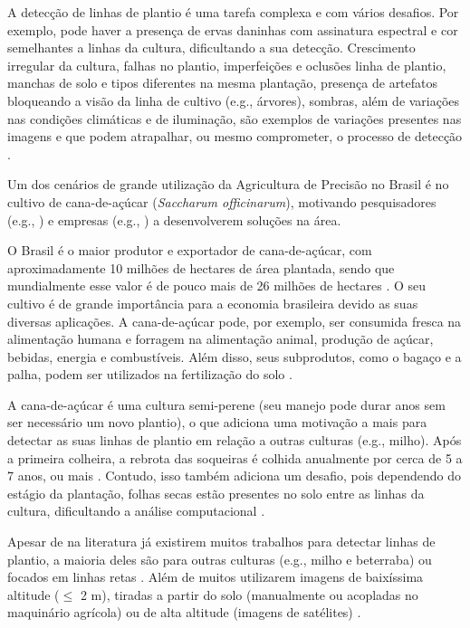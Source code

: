 \documentclass[12pt, a4paper, english, brazil]{article}
\begin{document}
A detecção de linhas de plantio é uma tarefa complexa e com vários desafios. Por exemplo, pode haver a presença de ervas daninhas com assinatura espectral e cor semelhantes a linhas da cultura, dificultando a sua detecção. Crescimento irregular da cultura, falhas no plantio, imperfeições e oclusões linha de plantio, manchas de solo e tipos diferentes na mesma plantação, presença de artefatos bloqueando a visão da linha de cultivo (e.g., árvores), sombras, além de variações nas condições climáticas e de iluminação, são exemplos de variações presentes nas imagens e que podem atrapalhar, ou mesmo comprometer, o processo de detecção  \cite{Rabab_2021, Doha_2021}.

Um dos cenários de grande utilização da Agricultura de Precisão no Brasil é no cultivo de cana-de-açúcar (\textit{Saccharum officinarum}), motivando pesquisadores (e.g., ) e empresas (e.g., ) a desenvolverem soluções na área.

O Brasil é o maior produtor e exportador de cana-de-açúcar, com aproximadamente 10 milhões de hectares de área plantada, sendo que mundialmente esse valor é de pouco mais de 26 milhões de hectares \cite{Ritchie_2020, IBGE_2021, FAOSTAT_2021}. O seu cultivo é de grande importância para a economia brasileira devido as suas diversas aplicações. A cana-de-açúcar pode, por exemplo, ser consumida fresca na alimentação humana e forragem na alimentação animal, produção de açúcar, bebidas, energia e combustíveis. Além disso, seus subprodutos, como o bagaço e a palha, podem ser utilizados na fertilização do solo \cite{Oliveira_2018}.

A cana-de-açúcar é uma cultura semi-perene (seu manejo pode durar anos sem ser necessário um novo plantio), o que adiciona uma motivação a mais para detectar as suas linhas de plantio em relação a outras culturas (e.g., milho). Após a primeira colheira, a rebrota das soqueiras é colhida anualmente por cerca de 5 a 7 anos, ou mais \cite{Rudorff_2010}. Contudo, isso também adiciona um desafio, pois dependendo do estágio da plantação, folhas secas estão presentes no solo entre as linhas da cultura, dificultando a análise computacional \cite{Silva_2020}.

Apesar de na literatura já existirem muitos trabalhos para detectar linhas de plantio, a maioria deles são para outras culturas (e.g., milho e beterraba) ou focados em linhas retas \cite{Pereira_Junior_2020}. Além de muitos utilizarem imagens de baixíssima altitude ($\le$ 2 m), tiradas a partir do solo (manualmente ou acopladas no maquinário agrícola) ou de alta altitude (imagens de satélites) \cite{Hasan_2021}.
\end{document}
